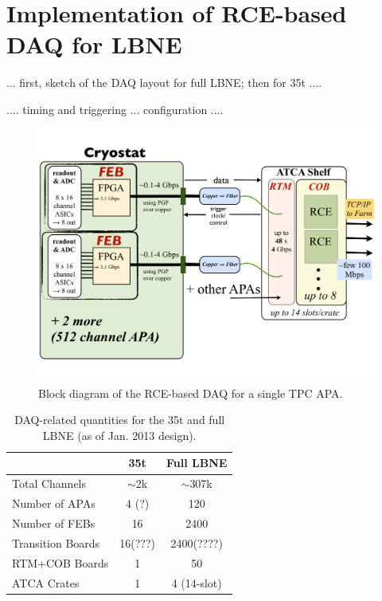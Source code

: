 \section{Implementation of RCE-based DAQ for LBNE}




...  first, sketch of the DAQ layout for full LBNE;  then for 35t ....

....  timing and triggering ...
configuration ....  

\begin{figure}[p]
\includegraphics[scale=0.6,angle=90]{LBNE-DAQ-BlockDiagram.pdf}
\caption{Block diagram of the RCE-based DAQ for a single TPC APA.}
\label{fig:blockDiag}
\end{figure} 


\begin{table}[tbh]
\begin{center}
\begin{tabular}{|l|c|c|}   
\hline \hline 
    & 35t  & Full LBNE \\      
\hline
   Total Channels        & $\sim$2k &$\sim$307k \\ 
	Number of APAs     &  4 (?)     &    120        \\ 
   Number of FEBs       & 16 & 2400 \\ 
   Transition Boards    & 16(???) & 2400(????) \\ 
   RTM+COB Boards    & 1   &  50 \\
   ATCA Crates            & 1   &  4 (14-slot)   \\ 
\hline \hline
\end{tabular}
\caption[]{DAQ-related quantities for the 35t and full LBNE (as of Jan. 2013 design).}
\label{tab:daqsumm} 
\end{center}
\end{table}


